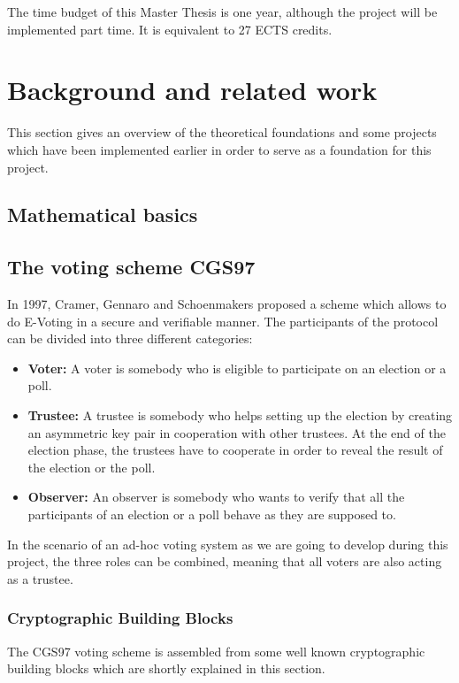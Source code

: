 \documentclass[numbers=noenddot, abstract=on]{scrreprt}
\begin{document}
The time budget of this Master Thesis is one year, although the project will be
implemented part time. It is equivalent to 27 ECTS credits. 

\chapter{Background and related work}
\label{cha:brw}
This section gives an overview of the theoretical foundations and some projects
which have been implemented earlier in order to serve as a foundation for this
project.

\section{Mathematical basics}
\label{sec:mathbasics}


\section{The voting scheme CGS97}
\label{sec:CGS97}
In 1997, Cramer, Gennaro and Schoenmakers proposed a scheme \cite{CGS97} which
allows to do E-Voting in a secure and verifiable manner. The participants of
the protocol can be divided into three different categories:
\begin{itemize}
  \item \textbf{Voter:} A voter is somebody who is eligible to participate on
  an election or a poll. 
  \item \textbf{Trustee:} A trustee is somebody who helps setting up the
  election by creating an asymmetric key pair in cooperation with other
  trustees.
  At the end of the election phase, the trustees have to cooperate in order to
  reveal the result of the election or the poll.
  \item \textbf{Observer:} An observer is somebody who wants to verify that all
  the participants of an election or a poll behave as they are supposed to.
\end{itemize}

In the scenario of an ad-hoc voting system as we are going to develop during
this project, the three roles can be combined, meaning that all voters are also
acting as a trustee. 

\subsection{Cryptographic Building Blocks}
\label{sec:buildingblocks}
The CGS97 voting scheme is assembled from some well known cryptographic building
blocks which are shortly explained in this section.
\end{document}
